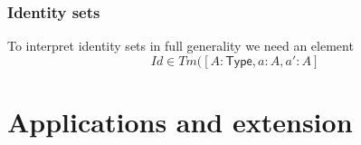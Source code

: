 \documentclass[handout,xcolor=dvipsnames]{beamer}
\renewcommand\type{\mathsf{Type}}
\begin{document}
\begin{frame}
  \frametitle{Identity sets}
To interpret identity sets in full generality we need an element
\begin{equation*}
Id\in Tm([A:\type,a:A,a':A]
\end{equation*}
\end{frame}

\section{Applications and extension}
\end{document}

